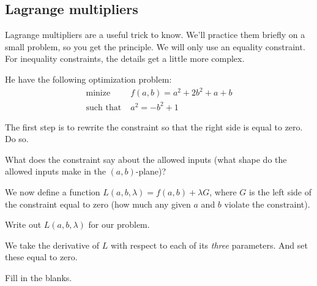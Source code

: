 \documentclass[11pt]{article}
\begin{document}
\subsection{Lagrange multipliers} 

Lagrange multipliers are a useful trick to know. We'll practice them briefly on a small problem, so you get the principle. We will only use an equality constraint. For inequality constraints, the details get a little more complex.

He have the following optimization problem:
\begin{align*}
\text{minize} &\;f(a, b) = a^2 + 2b^2 + a + b\\
\text{such that} &\;a^2 = - b^2 + 1
\end{align*}

\qu The first step is to rewrite the constraint so that the right side is equal to zero. Do so.



\qu What does the constraint say about the allowed inputs (what shape do the allowed inputs make in the $(a, b)$-plane)?



We now define a function $L(a, b, \lambda) = f(a, b) + \lambda G$, where $G$ is the left side of the constraint equal to zero (how much any given $a$ and $b$ violate the constraint).\footnotemark 

\qu Write out $L(a, b, \lambda)$ for our problem.



We take the derivative of $L$ with respect to each of its \emph{three} parameters. And set these equal to zero. 

\qu Fill in the blanks.
\end{document}
